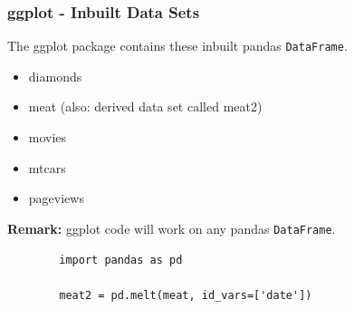\documentclass{beamer}
\begin{document}
\begin{frame}
\frametitle{ggplot - Inbuilt Data Sets}
\Large
The ggplot package contains these inbuilt  pandas \texttt{DataFrame}.
	\begin{itemize}
		\item diamonds
		\item meat  (also: derived data set called meat2)
		\item movies
		\item mtcars
		\item pageviews
		\end{itemize}
		\bigskip
\noindent \textbf{Remark:}
ggplot code will work on any pandas \texttt{DataFrame}. 
\end{frame}
\begin{frame}[fragile]
	\Large
	\begin{framed}
		\begin{verbatim}
		import pandas as pd
		
		meat2 = pd.melt(meat, id_vars=['date'])
		\end{verbatim}
	\end{framed}
\end{frame}
\end{document}
